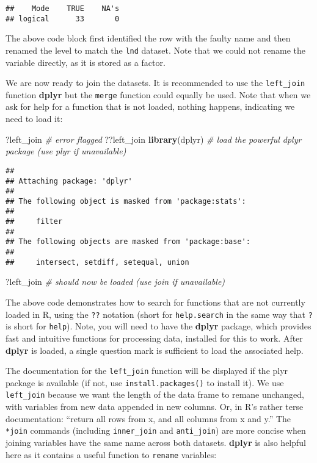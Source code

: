 \documentclass[]{article}
\newenvironment{Shaded}{}{}
\newcommand{\KeywordTok}[1]{\textcolor[rgb]{0.00,0.44,0.13}{\textbf{{#1}}}}
\newcommand{\CommentTok}[1]{\textcolor[rgb]{0.38,0.63,0.69}{\textit{{#1}}}}
\newcommand{\NormalTok}[1]{{#1}}
\begin{document}
\begin{verbatim}
##    Mode    TRUE    NA's 
## logical      33       0
\end{verbatim}

The above code block first identified the row with the faulty name and
then renamed the level to match the \texttt{lnd} dataset. Note that we
could not rename the variable directly, as it is stored as a factor.

We are now ready to join the datasets. It is recommended to use the
\texttt{left\_join} function \textbf{dplyr} but the \texttt{merge}
function could equally be used. Note that when we ask for help for a
function that is not loaded, nothing happens, indicating we need to load
it:

\begin{Shaded}
\begin{Highlighting}[]
\NormalTok{?left_join }\CommentTok{# error flagged}
\NormalTok{??left_join}
\KeywordTok{library}\NormalTok{(dplyr) }\CommentTok{# load the powerful dplyr package (use plyr if unavailable)}
\end{Highlighting}
\end{Shaded}

\begin{verbatim}
## 
## Attaching package: 'dplyr'
## 
## The following object is masked from 'package:stats':
## 
##     filter
## 
## The following objects are masked from 'package:base':
## 
##     intersect, setdiff, setequal, union
\end{verbatim}

\begin{Shaded}
\begin{Highlighting}[]
\NormalTok{?left_join }\CommentTok{# should now be loaded (use join if unavailable)}
\end{Highlighting}
\end{Shaded}

The above code demonstrates how to search for functions that are not
currently loaded in R, using the \texttt{??} notation (short for
\texttt{help.search} in the same way that \texttt{?} is short for
\texttt{help}). Note, you will need to have the \textbf{dplyr} package,
which provides fast and intuitive functions for processing data,
installed for this to work. After \textbf{dplyr} is loaded, a single
question mark is sufficient to load the associated help.

The documentation for the \texttt{left\_join} function will be displayed
if the plyr package is available (if not, use
\texttt{install.packages()} to install it). We use \texttt{left\_join}
because we want the length of the data frame to remane unchanged, with
variables from new data appended in new columns. Or, in R's rather terse
documentation: ``return all rows from x, and all columns from x and y.''
The \texttt{*join} commands (including \texttt{inner\_join} and
\texttt{anti\_join}) are more concise when joining variables have the
same name across both datasets. \textbf{dplyr} is also helpful here as
it contains a useful function to \texttt{rename} variables:
\end{document}
